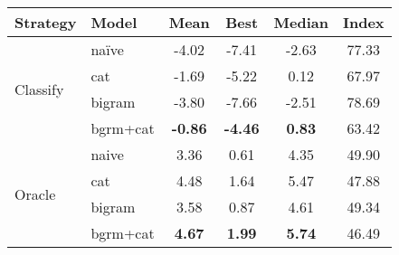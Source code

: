 \begin{tabular}{ll|ccc|c}
Strategy &  Model     &	Mean&	Best&	Median&	Index\\
\hline
\multirow{4}{*}{Classify}
& na\"ive & -4.02 & -7.41 & -2.63 & 77.33 \\
& cat & -1.69 & -5.22 & 0.12 & 67.97 \\
& bigram & -3.80 & -7.66 & -2.51 & 78.69 \\
& bgrm+cat & {\bf -0.86} & {\bf -4.46} & {\bf 0.83} & 63.42 \\
\hline
\multirow{4}{*}{Oracle}
& naive & 3.36 & 0.61 & 4.35 & 49.90 \\
& cat & 4.48 & 1.64 & 5.47 & 47.88 \\
& bigram & 3.58 & 0.87 & 4.61 & 49.34 \\
& bgrm+cat & {\bf 4.67} & {\bf 1.99} & {\bf 5.74} & 46.49 \\
\hline
\end{tabular}
